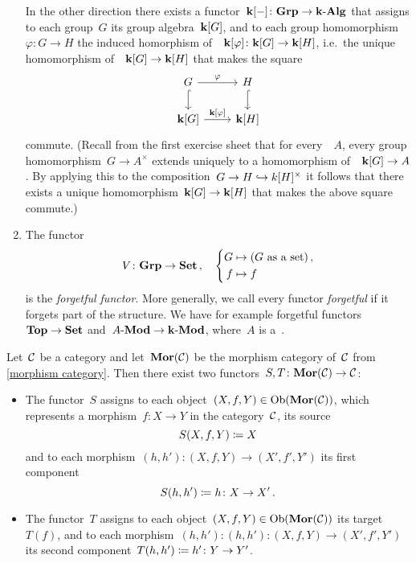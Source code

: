 \begin{example}
\begin{enumerate}
      In the other direction there exists a functor~$\mathbf{k}[-] \colon \mathbf{Grp} \to \text{$\mathbf{k}$-$\mathbf{Alg}$}$ that assigns to each group~$G$ its group algebra~$\mathbf{k}[G]$, and to each group homomorphism~$\varphi \colon G \to H$ the induced homorphism of~{\kalgs}~$\mathbf{k}[\varphi] \colon \mathbf{k}[G] \to \mathbf{k}[H]$, i.e.\ the unique homomorphism of~{\kalgs}~$\mathbf{k}[G] \to \mathbf{k}[H]$ that makes the square
      \[
        \begin{tikzcd}
            G
            \arrow{r}[above]{\varphi}
            \arrow[hook]{d}
          & H
            \arrow[hook]{d}
          \\
            \kf[G]
            \arrow{r}[above]{\kf[\varphi]}
          & \kf[H]
        \end{tikzcd}
      \]
      commute.
      (Recall from the first exercise sheet that for every~{\kalg}~$A$, every group homomorphism~$G \to A^\times$ extends uniquely to a homomorphism of~{\kalgs}~$\mathbf{k}[G] \to A$.
      By applying this to the composition~$G \to H \hookrightarrow k[H]^\times$ it follows that there exists a unique homomorphism~$\mathbf{k}[G] \to \mathbf{k}[H]$ that makes the above square commute.)
    \item
      The functor
      \[
                V
        \colon  \mathbf{Grp}
        \to     \mathbf{Set} \,,
        \quad   \left\{
                  \begin{aligned}
                              G
                    &\mapsto  (\text{$G$ as a set}) \,,
                    \\
                              f
                    &\mapsto  f
                  \end{aligned}
                \right.
      \]
      is the \emph{forgetful functor}.
      More generally, we call every functor \emph{forgetful} if it forgets part of the structure.
      We have for example forgetful functors~$\mathbf{Top} \to \mathbf{Set}$ and~$\text{$A$-$\mathbf{Mod}$} \to \text{$\mathbf{k}$-$\mathbf{Mod}$}$, where~$A$ is a~{\kalg}.
  \end{enumerate}
\end{example}


\begin{example*}
  \label{source target functors}
  Let~$\mathcal{C}$ be a category and let~$\mathbf{Mor}(\mathcal{C})$ be the morphism category of~$\mathcal{C}$ from \cref{morphism category}.
  Then there exist two functors~$S, T \colon \mathbf{Mor}(\mathcal{C}) \to \mathcal{C}$:
  \begin{itemize}
    \item
      The functor~$S$ assigns to each object~$(X,f,Y) \in \operatorname{Ob}(\mathbf{Mor}(\mathcal{C}))$, which represents a morphism~$f \colon X \to Y$ in the category~$\mathcal{C}$, its source
      \[
                  S(X,f,Y)
        \coloneqq  X
      \]
      and to each morphism~$(h,h') \colon (X,f,Y) \to (X',f',Y')$ its first component
      \[
                  S(h,h')
        \coloneqq  h \colon X \to X' \,.
      \]
    \item
      The functor~$T$ assigns to each object~$(X,f,Y) \in \operatorname{Ob}(\mathbf{Mor}(\mathcal{C}))$ its target~$T(f)$, and to each morphism~$(h,h') \colon (h,h') \colon (X,f,Y) \to (X',f',Y')$ its second component~$T(h,h') \coloneqq h' \colon Y \to Y'$.
  \end{itemize}
\end{example*}


